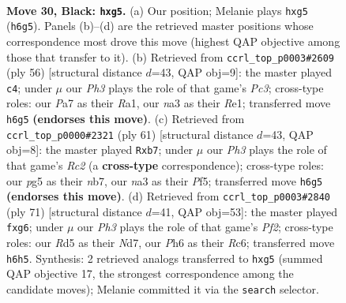 \documentclass[11pt]{article}
\begin{document}
\clearpage

\begin{figure}[p]\centering
\begin{subfigure}{0.46\textwidth}\centering
\resizebox{\linewidth}{!}{%
\newchessgame
\chessboard[
  setfen={1r6/pp4k1/7p/2pr2P1/4p1bP/N3P3/PP3K2/R1B5 b - - 0 30},
  showmover=false,
  pgfstyle=straightmove, color=movearrow, markmove={h6-g5}
]}
\caption{}
\end{subfigure}\hfill
\begin{subfigure}{0.46\textwidth}\centering
\resizebox{\linewidth}{!}{%
\newchessgame
\chessboard[
  setfen={1rb5/6k1/pp1p3r/3Bpp2/P7/2PP2PP/6K1/R3R3 w - - 2 29},
  showmover=false,
  pgfstyle=straightmove, color=movearrow, markmove={c3-c4}
]}
\caption{}
\end{subfigure}
\\[4pt]
\begin{subfigure}{0.46\textwidth}\centering
\resizebox{\linewidth}{!}{%
\newchessgame
\chessboard[
  setfen={6k1/pNr2pp1/8/1p3p2/3B3b/P3PP2/6PP/R5K1 b - - 0 31},
  showmover=false,
  pgfstyle=straightmove, color=movearrow, markmove={c7-b7}
]}
\caption{}
\end{subfigure}\hfill
\begin{subfigure}{0.46\textwidth}\centering
\resizebox{\linewidth}{!}{%
\newchessgame
\chessboard[
  setfen={6k1/3n1p2/p1rPp1Pp/1p2P3/1B6/P3R3/5PP1/5K2 b - - 0 36},
  showmover=false,
  pgfstyle=straightmove, color=movearrow, markmove={f7-g6}
]}
\caption{}
\end{subfigure}
\caption{\textbf{Move 30, Black: \texttt{hxg5}.} (a) Our position; Melanie plays \texttt{hxg5} (\texttt{h6g5}). Panels (b)--(d) are the retrieved master positions whose correspondence most drove this move (highest QAP objective among those that transfer to it). (b) Retrieved from \texttt{ccrl\_top\_p0003\#2609} (ply 56) [structural distance $d$=43, QAP obj=9]: the master played \texttt{c4}; under $\mu$ our \emph{Ph3} plays the role of that game's \emph{Pc3}; cross-type roles: our \emph{P}a7 as their \emph{R}a1, our \emph{n}a3 as their \emph{R}e1; transferred move \texttt{h6g5} \textbf{(endorses this move)}. (c) Retrieved from \texttt{ccrl\_top\_p0000\#2321} (ply 61) [structural distance $d$=43, QAP obj=8]: the master played \texttt{Rxb7}; under $\mu$ our \emph{Ph3} plays the role of that game's \emph{Rc2} (a \textbf{cross-type} correspondence); cross-type roles: our \emph{p}g5 as their \emph{n}b7, our \emph{n}a3 as their \emph{P}f5; transferred move \texttt{h6g5} \textbf{(endorses this move)}. (d) Retrieved from \texttt{ccrl\_top\_p0003\#2840} (ply 71) [structural distance $d$=41, QAP obj=53]: the master played \texttt{fxg6}; under $\mu$ our \emph{Ph3} plays the role of that game's \emph{Pf2}; cross-type roles: our \emph{R}d5 as their \emph{N}d7, our \emph{P}h6 as their \emph{R}c6; transferred move \texttt{h6h5}. Synthesis: 2 retrieved analogs transferred to \texttt{hxg5} (summed QAP objective 17, the strongest correspondence among the candidate moves); Melanie committed it via the \texttt{search} selector.}
\label{fig:thought-m59}
\end{figure}
\end{document}
